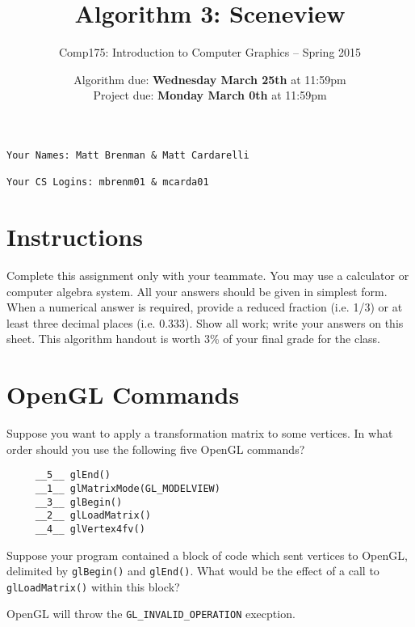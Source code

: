 \documentclass[10pt,twocolumn]{article}
\title{\Huge{\bf Algorithm 3: Sceneview}}
\author{Comp175: Introduction to Computer Graphics -- Spring 2015}
\date{Algorithm due:  {\bf Wednesday March 25th} at 11:59pm\\
Project due:  {\bf Monday March 0th} at 11:59pm}
\begin{document}
\maketitle

\begin{verbatim}
Your Names: Matt Brenman & Matt Cardarelli

Your CS Logins: mbrenm01 & mcarda01
\end{verbatim}


\section{Instructions}
Complete this assignment only with your teammate. You may use a
calculator or computer algebra system. All your answers should be given in simplest form.
When a numerical answer is required, provide a reduced fraction (i.e. 1/3) or at least three
decimal places (i.e. 0.333). Show all work; write your answers on this sheet. This algorithm handout is worth 3\% of your final grade for the class.

\section{OpenGL Commands}
\begin{framed}
 Suppose you want to apply a transformation matrix to some vertices. In what order should you use the following five OpenGL commands?
\begin{verbatim}
     __5__ glEnd()
     __1__ glMatrixMode(GL_MODELVIEW)
     __3__ glBegin()
     __2__ glLoadMatrix()
     __4__ glVertex4fv()
\end{verbatim}
\end{framed}


\begin{framed}
 Suppose your program contained a block of code which sent vertices to OpenGL, delimited by {\tt glBegin()} and {\tt glEnd()}. What would be the effect of a call to {\tt glLoadMatrix()} within this block?


OpenGL will throw the {\tt GL\_INVALID\_OPERATION} execption.

\end{framed}
\end{document}
